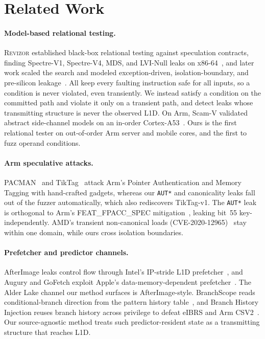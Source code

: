 \documentclass[letterpaper,twocolumn,10pt]{article}
\theoremstyle{definition}
\begin{document}
\section{Related Work}
\label{sec:related}

\paragraph{Model-based relational testing.}
\textsc{Revizor} established black-box relational testing against speculation contracts,
finding Spectre-V1, Spectre-V4, MDS, and LVI-Null leaks on
x86-64~\cite{revizor,revizor_micro}, and later work scaled the search and modeled
exception-driven, isolation-boundary, and pre-silicon
leakage~\cite{hide_seek,speculation_fault,isolation,amulet}. All keep every faulting
instruction safe for all inputs, so a condition is never violated, even transiently. We
instead satisfy a condition on the committed path and violate it only on a transient path, and detect leaks whose transmitting structure is never the observed L1D. On Arm,
Scam-V validated abstract side-channel models on an in-order
Cortex-A53~\cite{scamv,scamv_micro}. Ours is the first relational tester on
out-of-order Arm server and mobile cores, and the first to fuzz operand conditions.

\paragraph{Arm speculative attacks.}
PACMAN~\cite{pacman} and TikTag~\cite{tiktag} attack Arm's Pointer Authentication
and Memory Tagging with hand-crafted gadgets, whereas our \texttt{AUT*} and
canonicality leaks fall out of the fuzzer automatically, which also rediscovers
TikTag-v1. The \texttt{AUT*} leak is orthogonal to Arm's FEAT\_FPACC\_SPEC
mitigation~\cite{arm_fpacc_spec}, leaking bit~55 key-independently. AMD's transient non-canonical
loads (CVE-2020-12965)~\cite{noncanonical_amd,amd_sb1010} stay within one domain, while ours
cross isolation boundaries.

\paragraph{Prefetcher and predictor channels.}
AfterImage leaks control flow through Intel's IP-stride L1D
prefetcher~\cite{afterimage}, and Augury and GoFetch exploit Apple's
data-memory-dependent prefetcher~\cite{augury,gofetch}. The Alder Lake channel our
method surfaces is AfterImage-style. BranchScope reads conditional-branch direction
from the pattern history table~\cite{branchscope}, and Branch History Injection reuses
branch history across privilege to defeat eIBRS and Arm CSV2~\cite{bhi}. Our source-agnostic
method treats such predictor-resident state as a transmitting structure that reaches L1D.
\end{document}
